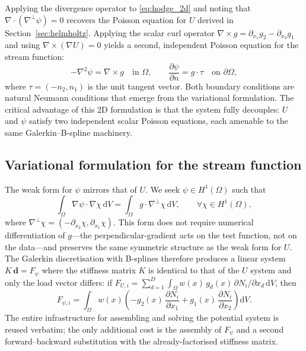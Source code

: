\documentclass[11pt,a4paper]{article}
\newcommand{\dd}{\mathrm{d}}
\newcommand{\grad}{\nabla}
\newcommand{\Div}{\nabla\!\cdot\!}
\newcommand{\curl}{\nabla\!\times\!}
\newcommand{\perpgrad}{\nabla^{\!\perp}}
\begin{document}
Applying the divergence operator to \eqref{eq:hodge_2d} and noting that
$\Div(\perpgrad\psi) = 0$ recovers the Poisson equation for $U$ derived in
Section~\ref{sec:helmholtz}. Applying the scalar curl operator
$\curl g = \partial_{x_1} g_2 - \partial_{x_2} g_1$ and using
$\curl(\grad U) = 0$ yields a second, independent Poisson equation for the
stream function:
\begin{equation}
-\grad^2 \psi = \curl g \quad \text{in } \Omega,
\qquad
\frac{\partial \psi}{\partial n} = g \cdot \tau \quad \text{on } \partial\Omega,
\label{eq:poisson_psi}
\end{equation}
where $\tau = (-n_2, n_1)$ is the unit tangent vector. Both boundary
conditions are natural Neumann conditions that emerge from the variational
formulation. The critical advantage of this 2D formulation is that the system
fully decouples: $U$ and $\psi$ satisfy two independent scalar Poisson
equations, each amenable to the same Galerkin--B-spline machinery.

\subsection{Variational formulation for the stream function}

The weak form for $\psi$ mirrors that of $U$. We seek $\psi \in H^1(\Omega)$
such that
\begin{equation}
\int_\Omega \grad\psi \cdot \grad\chi \, \dd V
= \int_\Omega g \cdot \perpgrad\chi \, \dd V,
\qquad \forall \chi \in H^1(\Omega),
\label{eq:weak_psi}
\end{equation}
where $\perpgrad\chi = (-\partial_{x_2}\chi, \partial_{x_1}\chi)$. This form
does not require numerical differentiation of $g$---the perpendicular-gradient
acts on the test function, not on the data---and preserves the same symmetric
structure as the weak form for $U$. The Galerkin discretisation with B-splines
therefore produces a linear system $K\,\mathbf{d} = F_\psi$ where the stiffness
matrix $K$ is identical to that of the $U$ system and only the load vector
differs: if $F_{U,i} = \sum_{d=1}^{D} \int_\Omega w(x)\, g_d(x)\,
\partial N_i/\partial x_d \, \dd V$, then
\begin{equation}
F_{\psi,i} = \int_\Omega w(x) \left(
-g_2(x)\,\frac{\partial N_i}{\partial x_1}
+ g_1(x)\,\frac{\partial N_i}{\partial x_2}
\right) \dd V .
\label{eq:load_psi}
\end{equation}
The entire infrastructure for assembling and solving the potential system is
reused verbatim; the only additional cost is the assembly of $F_\psi$ and a
second forward--backward substitution with the already-factorised stiffness
matrix.
\end{document}
